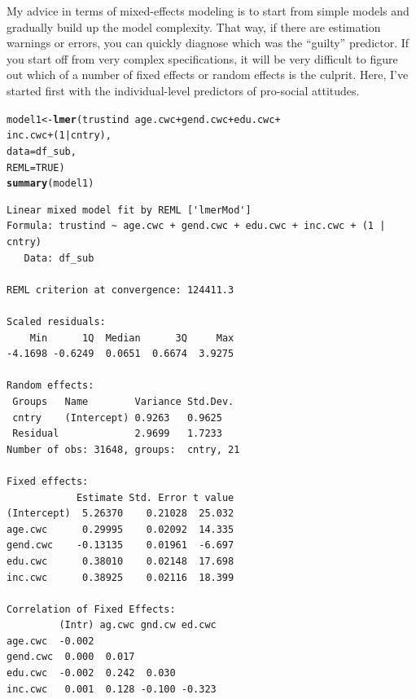 \documentclass[12pt,english]{article}\usepackage[]{graphicx}\usepackage[usenames, dvipsnames]{xcolor}
\makeatletter
\newcommand{\hlnum}[1]{\textcolor[rgb]{0.686,0.059,0.569}{#1}}%
\newcommand{\hlopt}[1]{\textcolor[rgb]{0,0,0}{#1}}%
\newcommand{\hlstd}[1]{\textcolor[rgb]{0.345,0.345,0.345}{#1}}%
\newcommand{\hlkwb}[1]{\textcolor[rgb]{0.69,0.353,0.396}{#1}}%
\newcommand{\hlkwc}[1]{\textcolor[rgb]{0.333,0.667,0.333}{#1}}%
\newcommand{\hlkwd}[1]{\textcolor[rgb]{0.737,0.353,0.396}{\textbf{#1}}}%
\newenvironment{kframe}{%
 \def\at@end@of@kframe{}%
 \ifinner\ifhmode%
  \def\at@end@of@kframe{\end{minipage}}%
  \begin{minipage}{\columnwidth}%
 \fi\fi%
 \def\FrameCommand##1{\hskip\@totalleftmargin \hskip-\fboxsep
 \colorbox{shadecolor}{##1}\hskip-\fboxsep
     \hskip-\linewidth \hskip-\@totalleftmargin \hskip\columnwidth}%
 \MakeFramed {\advance\hsize-\width
   \@totalleftmargin\z@ \linewidth\hsize
   \@setminipage}}%
 {\par\unskip\endMakeFramed%
 \at@end@of@kframe}
\newenvironment{knitrout}{}{} %
\makeatother
\begin{document}
My advice in terms of mixed-effects modeling is to start from simple models and gradually build up the model complexity. That way, if there are estimation warnings or errors, you can quickly diagnose which was the ``guilty'' predictor. If you start off from very complex specifications, it will be very difficult to figure out which of a number of fixed effects or random effects is the culprit. Here, I've started first with the individual-level predictors of pro-social attitudes.

\begin{knitrout}
\color{fgcolor}\begin{kframe}
\begin{alltt}
\hlstd{model1} \hlkwb{<-} \hlkwd{lmer}\hlstd{(trustind} \hlopt{~} \hlstd{age.cwc} \hlopt{+} \hlstd{gend.cwc} \hlopt{+} \hlstd{edu.cwc} \hlopt{+}
                 \hlstd{inc.cwc} \hlopt{+} \hlstd{(}\hlnum{1} \hlopt{|} \hlstd{cntry),}
               \hlkwc{data} \hlstd{= df_sub,}
               \hlkwc{REML} \hlstd{=} \hlnum{TRUE}\hlstd{)}
\hlkwd{summary}\hlstd{(model1)}
\end{alltt}
\begin{verbatim}
Linear mixed model fit by REML ['lmerMod']
Formula: trustind ~ age.cwc + gend.cwc + edu.cwc + inc.cwc + (1 | cntry)
   Data: df_sub

REML criterion at convergence: 124411.3

Scaled residuals: 
    Min      1Q  Median      3Q     Max 
-4.1698 -0.6249  0.0651  0.6674  3.9275 

Random effects:
 Groups   Name        Variance Std.Dev.
 cntry    (Intercept) 0.9263   0.9625  
 Residual             2.9699   1.7233  
Number of obs: 31648, groups:  cntry, 21

Fixed effects:
            Estimate Std. Error t value
(Intercept)  5.26370    0.21028  25.032
age.cwc      0.29995    0.02092  14.335
gend.cwc    -0.13135    0.01961  -6.697
edu.cwc      0.38010    0.02148  17.698
inc.cwc      0.38925    0.02116  18.399

Correlation of Fixed Effects:
         (Intr) ag.cwc gnd.cw ed.cwc
age.cwc  -0.002                     
gend.cwc  0.000  0.017              
edu.cwc  -0.002  0.242  0.030       
inc.cwc   0.001  0.128 -0.100 -0.323
\end{verbatim}
\end{kframe}
\end{knitrout}
\end{document}

